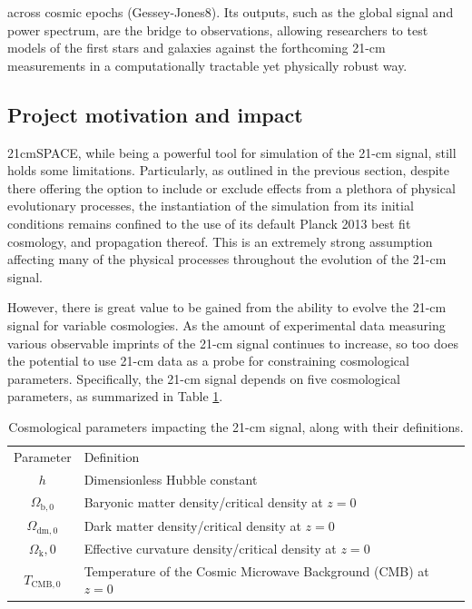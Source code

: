 \documentclass[floats,floatfix,showpacs,amssymb,prd,superscriptaddress,nofootinbib]{revtex4-2} %
\begin{document}
across cosmic epochs (Gessey-Jones8). Its outputs, such as the global signal and power spectrum, are the bridge to observations, allowing researchers to test models of the first stars and galaxies against the forthcoming 21-cm measurements in a computationally tractable yet physically robust way.


\subsection{Project motivation and impact}

21cmSPACE, while being a powerful tool for simulation of the 21-cm signal, still holds some limitations. Particularly, as outlined in the previous section, despite there offering the option to include or exclude effects from a plethora of physical evolutionary processes, the instantiation of the simulation from its initial conditions remains confined to the use of its default Planck 2013 best fit cosmology, and propagation thereof. This is an extremely strong assumption affecting many of the physical processes throughout the evolution of the 21-cm signal.

However, there is great value to be gained from the ability to evolve the 21-cm signal for variable cosmologies. As the amount of experimental data measuring various observable imprints of the 21-cm signal continues to increase, so too does the potential to use 21-cm data as a probe for constraining cosmological parameters. Specifically, the 21-cm signal depends on five cosmological parameters, as summarized in Table \ref{tab:cosmological_parameters}.


\begin{table}
    \centering
    \begin{tabular}{|c|l|}
        \hline
        Parameter & Definition\\ \hhline{|=|=|}
        $h$ & Dimensionless Hubble constant \\ \hline
        $\Omega_{\text{b}, 0}$ & Baryonic matter density/critical density at $z = 0$ \\ \hline
        $\Omega_{\text{dm}, 0}$ & Dark matter density/critical density at $z = 0$\\ \hline
        $\Omega_{\text{k}}, 0$ & Effective curvature density/critical density at $z = 0$\\ \hline
        $T_{\text{CMB},0}$ & Temperature of the Cosmic Microwave Background (CMB) at $z = 0$\\ \hline
    \end{tabular}
    \caption{Cosmological parameters impacting the 21-cm signal, along with their definitions.}
    \label{tab:cosmological_parameters}
\end{table}
\end{document}

